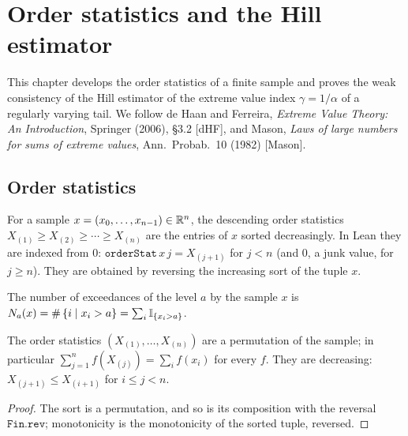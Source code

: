 \chapter{Order statistics and the Hill estimator}
\label{chap:hill}

This chapter develops the order statistics of a finite sample and proves the weak consistency of
the Hill estimator of the extreme value index $\gamma = 1/\alpha$ of a regularly varying tail. We
follow de Haan and Ferreira, \emph{Extreme Value Theory: An Introduction}, Springer (2006), \S3.2
[dHF], and Mason, \emph{Laws of large numbers for sums of extreme values}, Ann.\ Probab.\ 10
(1982) [Mason].

\section{Order statistics}

\begin{definition}
  \label{def:order-stat}
  \leanok
  For a sample $x = (x_0, \ldots, x_{n-1}) \in \mathbb{R}^n$, the descending order statistics
  $X_{(1)} \ge X_{(2)} \ge \cdots \ge X_{(n)}$ are the entries of $x$ sorted decreasingly. In Lean
  they are indexed from $0$: $\texttt{orderStat}\,x\,j = X_{(j+1)}$ for $j < n$ (and $0$, a junk
  value, for $j \ge n$). They are obtained by reversing the increasing sort of the tuple $x$.
\end{definition}

\begin{definition}
  \label{def:exceed-count}
  \leanok
  The number of exceedances of the level $a$ by the sample $x$ is
  $N_a(x) = \# \left\{  i \; | \; x_i > a  \right\} = \sum_i \mathbb{I}_{{\left\{ x_i > a \right\}}}$.
\end{definition}

\begin{lemma}
  \label{lem:order-stat-basic}
  \leanok
  The order statistics $(X_{(1)}, \ldots, X_{(n)})$ are a permutation of the sample; in particular
  $\sum_{j=1}^n f(X_{(j)}) = \sum_i f(x_i)$ for every $f$. They are decreasing:
  $X_{(j+1)} \le X_{(i+1)}$ for $i \le j < n$.
\end{lemma}
\begin{proof}
  \leanok
  The sort is a permutation, and so is its composition with the reversal $\texttt{Fin.rev}$;
  monotonicity is the monotonicity of the sorted tuple, reversed.
\end{proof}


